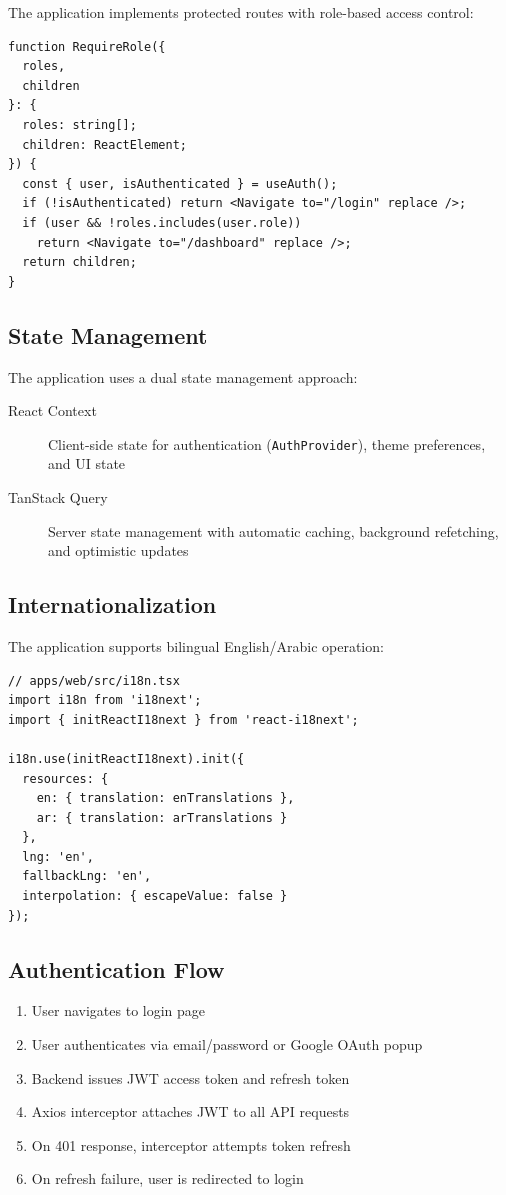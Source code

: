 \documentclass[11pt,a4paper]{article}
\begin{document}
The application implements protected routes with role-based access control:

\begin{lstlisting}[language={[Sharp]C}, caption=Protected Route Implementation]
function RequireRole({
  roles,
  children
}: {
  roles: string[];
  children: ReactElement;
}) {
  const { user, isAuthenticated } = useAuth();
  if (!isAuthenticated) return <Navigate to="/login" replace />;
  if (user && !roles.includes(user.role))
    return <Navigate to="/dashboard" replace />;
  return children;
}
\end{lstlisting}

\subsection{State Management}

The application uses a dual state management approach:

\begin{description}
  \item[React Context] Client-side state for authentication (\texttt{AuthProvider}), theme preferences, and UI state
  \item[TanStack Query] Server state management with automatic caching, background refetching, and optimistic updates
\end{description}

\subsection{Internationalization}

The application supports bilingual English/Arabic operation:

\begin{lstlisting}[language={[Sharp]C}, caption=i18n Configuration]
// apps/web/src/i18n.tsx
import i18n from 'i18next';
import { initReactI18next } from 'react-i18next';

i18n.use(initReactI18next).init({
  resources: {
    en: { translation: enTranslations },
    ar: { translation: arTranslations }
  },
  lng: 'en',
  fallbackLng: 'en',
  interpolation: { escapeValue: false }
});
\end{lstlisting}

\subsection{Authentication Flow}

\begin{enumerate}
  \item User navigates to login page
  \item User authenticates via email/password or Google OAuth popup
  \item Backend issues JWT access token and refresh token
  \item Axios interceptor attaches JWT to all API requests
  \item On 401 response, interceptor attempts token refresh
  \item On refresh failure, user is redirected to login
\end{enumerate}
\end{document}
